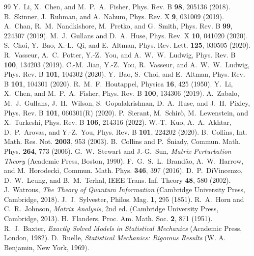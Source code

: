 \documentclass[aps,prx,reprint,superscriptaddress,nobibnotes,longbibliography]{revtex4-2}
\theoremstyle{remark}
\begin{document}
\begin{thebibliography}{99}
 Y.~Li, X.~Chen, and M.~P.~A.~Fisher, Phys. Rev. B \textbf{98}, 205136 (2018).
 B.~Skinner, J.~Ruhman, and A.~Nahum, Phys. Rev. X \textbf{9}, 031009 (2019).
 A.~Chan, R.~M.~Nandkishore, M.~Pretko, and G.~Smith, Phys. Rev. B \textbf{99}, 224307 (2019).
 M.~J.~Gullans and D.~A.~Huse, Phys. Rev. X \textbf{10}, 041020 (2020).
 S.~Choi, Y.~Bao, X.-L.~Qi, and E.~Altman, Phys. Rev. Lett. \textbf{125}, 030505 (2020).
 R.~Vasseur, A.~C.~Potter, Y.-Z.~You, and A.~W.~W.~Ludwig, Phys. Rev. B \textbf{100}, 134203 (2019).
 C.-M.~Jian, Y.-Z.~You, R.~Vasseur, and A.~W.~W.~Ludwig, Phys. Rev. B \textbf{101}, 104302 (2020).
 Y.~Bao, S.~Choi, and E.~Altman, Phys. Rev. B \textbf{101}, 104301 (2020).
 R.~M.~F.~Houtappel, Physica \textbf{16}, 425 (1950).
 Y.~Li, X.~Chen, and M.~P.~A.~Fisher, Phys. Rev. B \textbf{100}, 134306 (2019).
 A.~Zabalo, M.~J.~Gullans, J.~H.~Wilson, S.~Gopalakrishnan, D.~A.~Huse, and J.~H.~Pixley, Phys. Rev. B \textbf{101}, 060301(R) (2020).
 P.~Sierant, M.~Schir\`o, M.~Lewenstein, and X.~Turkeshi, Phys. Rev. B \textbf{106}, 214316 (2022).
 W.-T.~Kuo, A.~A.~Akhtar, D.~P.~Arovas, and Y.-Z.~You, Phys. Rev. B \textbf{101}, 224202 (2020).
 B.~Collins, Int. Math. Res. Not. \textbf{2003}, 953 (2003).
 B.~Collins and P.~\'Sniady, Commun. Math. Phys. \textbf{264}, 773 (2006).
 G.~W.~Stewart and J.-G.~Sun, \emph{Matrix Perturbation Theory} (Academic Press, Boston, 1990).
 F.~G.~S.~L.~Brand\~ao, A.~W.~Harrow, and M.~Horodecki, Commun. Math. Phys. \textbf{346}, 397 (2016).
 D.~P.~DiVincenzo, D.~W.~Leung, and B.~M.~Terhal, IEEE Trans. Inf. Theory \textbf{48}, 580 (2002).
 J.~Watrous, \emph{The Theory of Quantum Information} (Cambridge University Press, Cambridge, 2018).
 J.~J.~Sylvester, Philos. Mag. \textbf{1}, 295 (1851).
 R.~A.~Horn and C.~R.~Johnson, \emph{Matrix Analysis}, 2nd ed. (Cambridge University Press, Cambridge, 2013).
 H.~Flanders, Proc. Am. Math. Soc. \textbf{2}, 871 (1951).
 R.~J.~Baxter, \emph{Exactly Solved Models in Statistical Mechanics} (Academic Press, London, 1982).
 D.~Ruelle, \emph{Statistical Mechanics: Rigorous Results} (W. A. Benjamin, New York, 1969).

\end{thebibliography}
\end{document}
